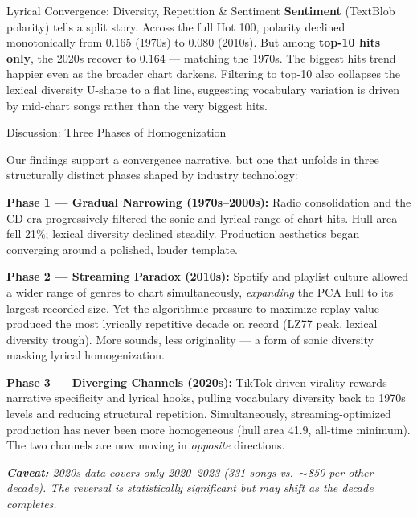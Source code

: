 \documentclass[final]{beamer}
\newlength{\colwidth}
\begin{document}
\begin{frame}[t]
\begin{columns}[t]
\begin{column}{\colwidth}
\begin{block}{Lyrical Convergence: Diversity, Repetition \& Sentiment}
    \smallskip
    \textbf{Sentiment} (TextBlob polarity) tells a split story. Across the full Hot 100, polarity declined monotonically from 0.165 (1970s) to 0.080 (2010s). But among \textbf{top-10 hits only}, the 2020s recover to 0.164 --- matching the 1970s. The biggest hits trend happier even as the broader chart darkens. Filtering to top-10 also collapses the lexical diversity U-shape to a flat line, suggesting vocabulary variation is driven by mid-chart songs rather than the very biggest hits.

  \end{block}

  \begin{block}{Discussion: Three Phases of Homogenization}

    Our findings support a convergence narrative, but one that unfolds in three structurally distinct phases shaped by industry technology:

    \smallskip
    \textbf{Phase 1 --- Gradual Narrowing (1970s--2000s):} Radio consolidation and the CD era progressively filtered the sonic and lyrical range of chart hits. Hull area fell 21\%; lexical diversity declined steadily. Production aesthetics began converging around a polished, louder template.

    \smallskip
    \textbf{Phase 2 --- Streaming Paradox (2010s):} Spotify and playlist culture allowed a wider range of genres to chart simultaneously, \emph{expanding} the PCA hull to its largest recorded size. Yet the algorithmic pressure to maximize replay value produced the most lyrically repetitive decade on record (LZ77 peak, lexical diversity trough). More sounds, less originality --- a form of sonic diversity masking lyrical homogenization.

    \smallskip
    \textbf{Phase 3 --- Diverging Channels (2020s):} TikTok-driven virality rewards narrative specificity and lyrical hooks, pulling vocabulary diversity back to 1970s levels and reducing structural repetition. Simultaneously, streaming-optimized production has never been more homogeneous (hull area 41.9, all-time minimum). The two channels are now moving in \emph{opposite} directions.

    \smallskip
    \textit{\textbf{Caveat:} 2020s data covers only 2020--2023 (331 songs vs.\ $\sim$850 per other decade). The reversal is statistically significant but may shift as the decade completes.}

  \end{block}


\end{column}
\end{columns}
\end{frame}
\end{document}
